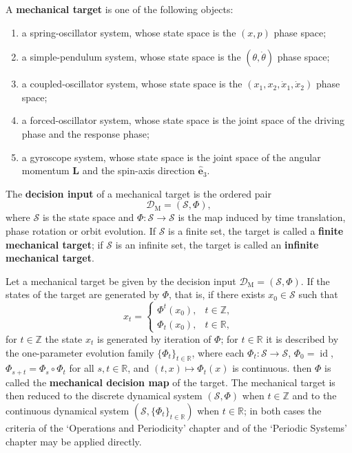 \begin{definition}\label{def:mech_target}
A \textbf{mechanical target} is one of the following objects:
\begin{enumerate}[label=(\roman*)]
    \item a spring-oscillator system, whose state space is the $(x,p)$ phase space;
    \item a simple-pendulum system, whose state space is the $(\theta,\dot\theta)$ phase space;
    \item a coupled-oscillator system, whose state space is the $(x_1,x_2,\dot x_1,\dot x_2)$ phase space;
    \item a forced-oscillator system, whose state space is the joint space of the driving phase and the response phase;
    \item a gyroscope system, whose state space is the joint space of the angular momentum $\mathbf L$ and the spin-axis direction $\hat{\mathbf e}_3$.
\end{enumerate}
The \textbf{decision input} of a mechanical target is the ordered pair
\[
\mathcal D_{\mathrm{M}}=(\mathcal S,\Phi),
\]
where $\mathcal S$ is the state space and $\Phi:\mathcal S\to\mathcal S$ is the map induced by time translation, phase rotation or orbit evolution. If $\mathcal S$ is a finite set, the target is called a \textbf{finite mechanical target}; if $\mathcal S$ is an infinite set, the target is called an \textbf{infinite mechanical target}.
\end{definition}

\begin{definition}\label{def:mech_periodization}
Let a mechanical target be given by the decision input $\mathcal D_{\mathrm{M}}=(\mathcal S,\Phi)$. If the states of the target are generated by $\Phi$, that is, if there exists $x_0\in\mathcal S$ such that
\[
x_t=\begin{cases}\Phi^t(x_0), & t\in\mathbb Z,\\ \Phi_t(x_0), & t\in\mathbb R,\end{cases}
\]
for $t\in\mathbb Z$ the state $x_t$ is generated by iteration of $\Phi$; for $t\in\mathbb R$ it is described by the one-parameter evolution family $\{\Phi_t\}_{t\in\mathbb R}$, where each $\Phi_t:\mathcal S\to\mathcal S$, $\Phi_0=\operatorname{id}$, $\Phi_{s+t}=\Phi_s\circ\Phi_t$ for all $s,t\in\mathbb R$, and $(t,x)\mapsto\Phi_t(x)$ is continuous.
then $\Phi$ is called the \textbf{mechanical decision map} of the target. The mechanical target is then reduced to the discrete dynamical system $(\mathcal S,\Phi)$ when $t\in\mathbb Z$ and to the continuous dynamical system $(\mathcal S,\{\Phi_t\}_{t\in\mathbb R})$ when $t\in\mathbb R$; in both cases the criteria of the `Operations and Periodicity' chapter and of the `Periodic Systems' chapter may be applied directly.
\end{definition}

